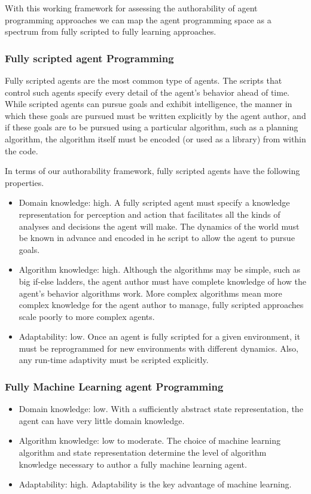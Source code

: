With this working framework for assessing the authorability of agent programming approaches we can map the agent programming space as a spectrum from fully scripted to fully learning approaches.

\subsubsection{Fully scripted agent Programming}

Fully scripted agents are the most common type of agents.  The scripts that control such agents specify every detail of the agent's behavior ahead of time.  While scripted agents can pursue goals and exhibit intelligence, the manner in which these goals are pursued must be written explicitly by the agent author, and if these goals are to be pursued using a particular algorithm, such as a planning algorithm, the algorithm itself must be encoded (or used as a library) from within the code.

In terms of our authorability framework, fully scripted agents have the
following properties.
\begin{itemize}
\item Domain knowledge: high. A fully scripted agent must specify a knowledge representation for perception and action that facilitates all the kinds of analyses and decisions the agent will make.  The dynamics of the world must be known in advance and encoded in he script to allow the agent to pursue goals.
\item Algorithm knowledge: high.  Although the algorithms may be simple, such as big if-else ladders, the agent author must have complete knowledge of how the agent's behavior algorithms work.  More complex algorithms mean more complex knowledge for the agent author to manage, fully scripted approaches scale poorly to more complex agents.
\item Adaptability: low.  Once an agent is fully scripted for a given environment, it must be reprogrammed for new environments with different dynamics.  Also, any run-time adaptivity must be scripted explicitly.
\end{itemize}

\subsubsection{Fully Machine Learning agent Programming}

\begin{itemize}
\item Domain knowledge: low. With a sufficiently abstract state
  representation, the agent can have very little domain knowledge.
\item Algorithm knowledge: low to moderate.  The choice of machine
  learning algorithm and state representation determine the level of
  algorithm knowledge necessary to author a fully machine learning
  agent.
\item Adaptability: high.  Adaptability is the key advantage of
  machine learning.
\end{itemize}

